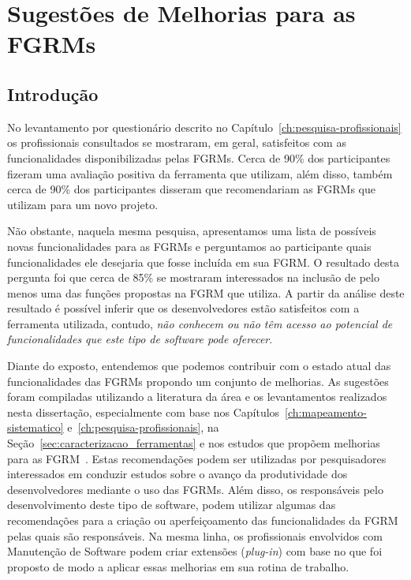 \chapter{Sugestões de Melhorias para as FGRMs}
\label{ch:sug_melhoria}

\section{Introdução}
\label{sec:sug_melhoria_intro}

No levantamento por questionário descrito no
Capítulo~\ref{ch:pesquisa-profissionais} os profissionais consultados se
mostraram, em geral, satisfeitos com as funcionalidades disponibilizadas pelas
FGRMs. Cerca de 90\% dos par\-ti\-ci\-pan\-tes fizeram uma avaliação positiva da
ferramenta que utilizam, além disso, também cerca de 90\% dos participantes
disseram que recomendariam as FGRMs que utilizam para um novo projeto.

Não obstante, naquela mesma pesquisa, apresentamos uma lista de possíveis novas
funcionalidades para as FGRMs e perguntamos ao participante quais
funcionalidades ele desejaria que fosse incluída  em sua FGRM\@. O resultado
desta pergunta foi que cerca de 85\% se mostraram interessados na inclusão de
pelo menos uma das funções propostas na FGRM que utiliza. A partir da análise
deste resultado é possível inferir que os desenvolvedores estão satisfeitos com
a ferramenta utilizada, contudo, \textit{não conhecem ou não têm acesso ao
    potencial de funcionalidades que este tipo de software pode oferecer}.

Diante do exposto, entendemos que podemos contribuir com o estado a\-tu\-al das
funcionalidades das FGRMs propondo um conjunto de melhorias. As sugestões foram
compiladas utilizando a literatura da área e os levantamentos realizados nesta
dissertação, especialmente com base nos
Capítulos~\ref{ch:mapeamento-sistematico} e~\ref{ch:pesquisa-profissionais}, na
Seção~\ref{sec:caracterizacao_ferramentas} e nos estudos que propõem melhorias
para as FGRM~\cite{zimmermann2009improving, bettenburg2008makes, singh2011bug}.
Estas recomendações podem ser utilizadas por pesquisadores interessados em
conduzir estudos sobre o avanço da produtividade dos desenvolvedores mediante o
uso das FGRMs. Além disso, os responsáveis pelo desenvolvimento deste tipo de
software, podem utilizar algumas das recomendações para a criação ou
aperfeiçoamento das funcionalidades da FGRM pelas quais são responsáveis. Na
mesma linha, os profissionais envolvidos com Manutenção de Software podem criar
extensões (\textit{plug-in}) com base no que foi proposto de modo a aplicar
essas melhorias em sua rotina de trabalho.

